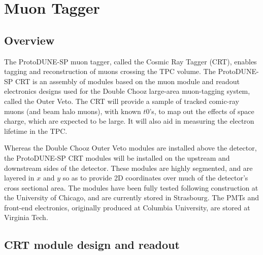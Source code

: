 

\section{Muon Tagger}
\label{sec:beam:muontagger}

\subsection{Overview}

The ProtoDUNE-SP muon tagger, called the Cosmic Ray Tagger (CRT), enables tagging and reconstruction of muons crossing the TPC volume. The ProtoDUNE-SP CRT is an assembly of modules based on the muon module and readout electronics designs used for the Double Chooz large-area muon-tagging system, called the Outer Veto.  
%
The CRT will provide a sample of tracked comic-ray muons (and beam halo muons), with known $t0$'s, to map out the effects of space charge, which are expected to be large. It will also aid in measuring the electron lifetime in the TPC.

Whereas the Double Chooz Outer Veto modules are installed above the detector, the ProtoDUNE-SP CRT modules will be installed on the upstream and downstream sides of the detector.
These modules are highly segmented, and are layered in $x$ and $y$ so as to provide 2D coordinates over much of the detector's cross sectional area.  
The modules have been fully tested following construction at the University of Chicago, and are currently stored in Strasbourg. The PMTs and front-end electronics, originally produced at Columbia University, are stored at Virginia Tech.



\subsection{CRT module design and readout}

